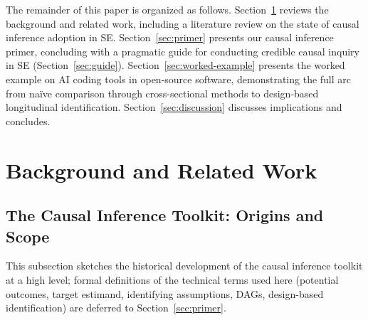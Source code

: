 The remainder of this paper is organized as follows.
Section~\ref{sec:background} reviews the background and related work, including a literature review on the state of causal inference adoption in SE.
Section~\ref{sec:primer} presents our causal inference primer, concluding with a pragmatic guide for conducting credible causal inquiry in SE (Section~\ref{sec:guide}).
Section~\ref{sec:worked-example} presents the worked example on AI coding tools in open-source software, demonstrating the full arc from na\"ive comparison through cross-sectional methods to design-based longitudinal identification.
Section~\ref{sec:discussion} discusses implications and concludes.

\section{Background and Related Work}
\label{sec:background}

\subsection{The Causal Inference Toolkit: Origins and Scope}
\label{sec:bg-causal-history}

This subsection sketches the historical development of the causal inference toolkit at a high level; formal definitions of the technical terms used here (potential outcomes, target estimand, identifying assumptions, DAGs, design-based identification) are deferred to Section~\ref{sec:primer}.

